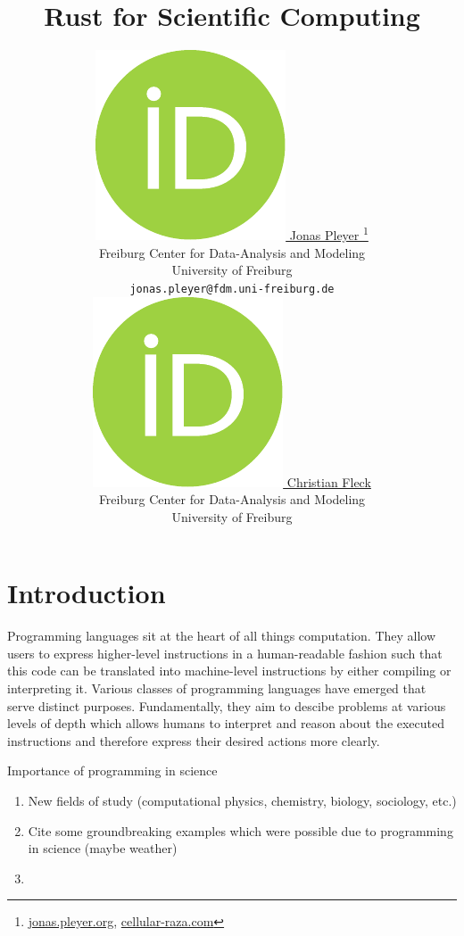 \documentclass{article}
\title{Rust for Scientific Computing}
\author{
    \href{https://orcid.org/0009-0001-0613-7978}{
        \includegraphics[scale=0.06]{orcid.pdf}
        \hspace{1mm}Jonas Pleyer
    }
    \thanks{
        \href{https://jonas.pleyer.org}{jonas.pleyer.org},
        \href{https://cellular-raza.com}{cellular-raza.com}
    }\\
    Freiburg Center for Data-Analysis and Modeling\\
    University of Freiburg\\
    \texttt{jonas.pleyer@fdm.uni-freiburg.de} \\
    \And
    \href{https://orcid.org/0000-0002-6371-4495}{
        \includegraphics[scale=0.06]{orcid.pdf}
        \hspace{1mm}Christian Fleck
    }\\
    Freiburg Center for Data-Analysis and Modeling\\
    University of Freiburg
}
\begin{document}
\maketitle

\begin{abstract}
\end{abstract}

\pagebreak
\tableofcontents

\twocolumn
\pagebreak

\prntlen{\columnwidth}


\section{Introduction}


Programming languages sit at the heart of all things computation.
They allow users to express higher-level instructions in a human-readable fashion such that this
code can be translated into machine-level instructions by either compiling or interpreting it.
Various classes of programming languages have emerged that serve distinct purposes.
Fundamentally, they aim to descibe problems at various levels of depth which allows humans to
interpret and reason about the executed instructions and therefore express their desired actions
more clearly.

Importance of programming in science
\begin{enumerate}
    \item New fields of study (computational physics, chemistry, biology, sociology, etc.)
    \item Cite some groundbreaking examples which were possible due to programming in
        science (maybe weather)
    \item
\end{enumerate}
\end{document}
